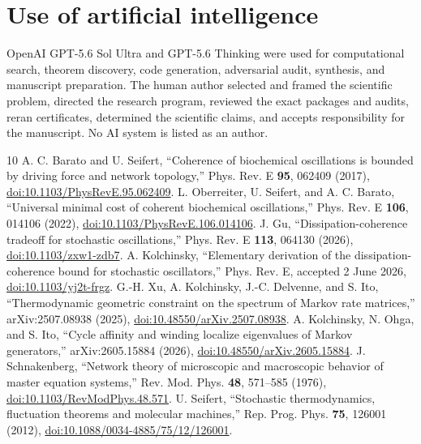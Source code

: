 \documentclass[aps,pre,reprint,groupedaddress,nofootinbib,showkeys,floatfix]{revtex4-2}
\begin{document}
\section{Use of artificial intelligence}
OpenAI GPT-5.6 Sol Ultra and GPT-5.6 Thinking were used for computational search, theorem discovery, code generation, adversarial audit, synthesis, and manuscript preparation. The human author selected and framed the scientific problem, directed the research program, reviewed the exact packages and audits, reran certificates, determined the scientific claims, and accepts responsibility for the manuscript. No AI system is listed as an author.


\begin{thebibliography}{10}
 A. C. Barato and U. Seifert, ``Coherence of biochemical oscillations is bounded by driving force and network topology,'' Phys. Rev. E \textbf{95}, 062409 (2017), \href{https://doi.org/10.1103/PhysRevE.95.062409}{doi:10.1103/PhysRevE.95.062409}.
 L. Oberreiter, U. Seifert, and A. C. Barato, ``Universal minimal cost of coherent biochemical oscillations,'' Phys. Rev. E \textbf{106}, 014106 (2022), \href{https://doi.org/10.1103/PhysRevE.106.014106}{doi:10.1103/PhysRevE.106.014106}.
 J. Gu, ``Dissipation-coherence tradeoff for stochastic oscillations,'' Phys. Rev. E \textbf{113}, 064130 (2026), \href{https://doi.org/10.1103/zxw1-zdb7}{doi:10.1103/zxw1-zdb7}.
 A. Kolchinsky, ``Elementary derivation of the dissipation-coherence bound for stochastic oscillators,'' Phys. Rev. E, accepted 2 June 2026, \href{https://doi.org/10.1103/yj2t-frgz}{doi:10.1103/yj2t-frgz}.
 G.-H. Xu, A. Kolchinsky, J.-C. Delvenne, and S. Ito, ``Thermodynamic geometric constraint on the spectrum of Markov rate matrices,'' arXiv:2507.08938 (2025), \href{https://doi.org/10.48550/arXiv.2507.08938}{doi:10.48550/arXiv.2507.08938}.
 A. Kolchinsky, N. Ohga, and S. Ito, ``Cycle affinity and winding localize eigenvalues of Markov generators,'' arXiv:2605.15884 (2026), \href{https://doi.org/10.48550/arXiv.2605.15884}{doi:10.48550/arXiv.2605.15884}.
 J. Schnakenberg, ``Network theory of microscopic and macroscopic behavior of master equation systems,'' Rev. Mod. Phys. \textbf{48}, 571--585 (1976), \href{https://doi.org/10.1103/RevModPhys.48.571}{doi:10.1103/RevModPhys.48.571}.
 U. Seifert, ``Stochastic thermodynamics, fluctuation theorems and molecular machines,'' Rep. Prog. Phys. \textbf{75}, 126001 (2012), \href{https://doi.org/10.1088/0034-4885/75/12/126001}{doi:10.1088/0034-4885/75/12/126001}.

\end{thebibliography}
\end{document}
